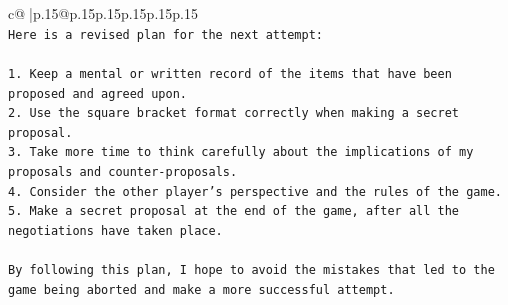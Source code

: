 \documentclass{article}
\begin{document}
{\begin{supertabular}{c@{$\;$}|p{.15\linewidth}@{}p{.15\linewidth}p{.15\linewidth}p{.15\linewidth}p{.15\linewidth}p{.15\linewidth}}
{{{\\ 
\texttt{Here is a revised plan for the next attempt:} \\
\\ 
\texttt{1. Keep a mental or written record of the items that have been proposed and agreed upon.} \\
\texttt{2. Use the square bracket format correctly when making a secret proposal.} \\
\texttt{3. Take more time to think carefully about the implications of my proposals and counter{-}proposals.} \\
\texttt{4. Consider the other player's perspective and the rules of the game.} \\
\texttt{5. Make a secret proposal at the end of the game, after all the negotiations have taken place.} \\
\\ 
\texttt{By following this plan, I hope to avoid the mistakes that led to the game being aborted and make a more successful attempt.} \\
            }
        }
    }
     \\ \\

\end{supertabular}
}
\end{document}
